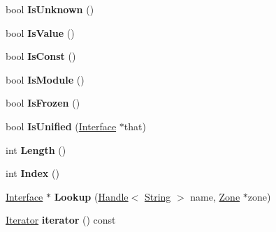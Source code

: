 \begin{DoxyCompactItemize}
\item 
\hypertarget{classv8_1_1internal_1_1_interface_a64d495e58cbca6ce84f6a3ebcbd4fc83}{}bool {\bfseries Is\+Unknown} ()\label{classv8_1_1internal_1_1_interface_a64d495e58cbca6ce84f6a3ebcbd4fc83}

\item 
\hypertarget{classv8_1_1internal_1_1_interface_a6a7d9a086086eaf42c9e50b8aa046313}{}bool {\bfseries Is\+Value} ()\label{classv8_1_1internal_1_1_interface_a6a7d9a086086eaf42c9e50b8aa046313}

\item 
\hypertarget{classv8_1_1internal_1_1_interface_ae621a022b3edcff0c683341308868ec5}{}bool {\bfseries Is\+Const} ()\label{classv8_1_1internal_1_1_interface_ae621a022b3edcff0c683341308868ec5}

\item 
\hypertarget{classv8_1_1internal_1_1_interface_a2dd73245d0086b31f57548b6e323e3dd}{}bool {\bfseries Is\+Module} ()\label{classv8_1_1internal_1_1_interface_a2dd73245d0086b31f57548b6e323e3dd}

\item 
\hypertarget{classv8_1_1internal_1_1_interface_a8551e57c077bd4ca9dd74973711a3140}{}bool {\bfseries Is\+Frozen} ()\label{classv8_1_1internal_1_1_interface_a8551e57c077bd4ca9dd74973711a3140}

\item 
\hypertarget{classv8_1_1internal_1_1_interface_a0ff6553f8f43c3f89fffc8714d5cd0cc}{}bool {\bfseries Is\+Unified} (\hyperlink{classv8_1_1internal_1_1_interface}{Interface} $\ast$that)\label{classv8_1_1internal_1_1_interface_a0ff6553f8f43c3f89fffc8714d5cd0cc}

\item 
\hypertarget{classv8_1_1internal_1_1_interface_ab7d172c9fae69b48ff83bd83ccc2fa6a}{}int {\bfseries Length} ()\label{classv8_1_1internal_1_1_interface_ab7d172c9fae69b48ff83bd83ccc2fa6a}

\item 
\hypertarget{classv8_1_1internal_1_1_interface_a397bc0dc8c12e5962dfb43e993dc9808}{}int {\bfseries Index} ()\label{classv8_1_1internal_1_1_interface_a397bc0dc8c12e5962dfb43e993dc9808}

\item 
\hypertarget{classv8_1_1internal_1_1_interface_aab6402757208cf4b86f472ab3aa0b34e}{}\hyperlink{classv8_1_1internal_1_1_interface}{Interface} $\ast$ {\bfseries Lookup} (\hyperlink{classv8_1_1internal_1_1_handle}{Handle}$<$ \hyperlink{classv8_1_1internal_1_1_string}{String} $>$ name, \hyperlink{classv8_1_1internal_1_1_zone}{Zone} $\ast$zone)\label{classv8_1_1internal_1_1_interface_aab6402757208cf4b86f472ab3aa0b34e}

\item 
\hypertarget{classv8_1_1internal_1_1_interface_a713f424d6fd280f1cf53e513b75870aa}{}\hyperlink{classv8_1_1internal_1_1_interface_1_1_iterator}{Iterator} {\bfseries iterator} () const \label{classv8_1_1internal_1_1_interface_a713f424d6fd280f1cf53e513b75870aa}

\end{DoxyCompactItemize}
